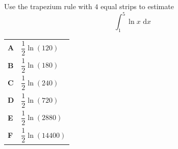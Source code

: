 \documentclass[11pt,a4paper]{article}
\begin{document}
\clearpage
\thispagestyle{djspaper}
\vspace*{8pt}
\begin{enumerate}[label=\textbf{\arabic*.},leftmargin=*,itemsep=0pt,start=4]
\questionitem[Integration]
Use the trapezium rule with $4$ equal strips to estimate \[ \int_{1}^{5} \ln x\,\,\mathrm{d}x \]

\par\vspace*{12pt}
\begin{tabularx}{\linewidth}{@{}>{\bfseries}l Y@{}}
A &
$\dfrac{1}{2}\ln(120)$
\\[0.8em]
B &
$\dfrac{1}{2}\ln(180)$
\\[0.8em]
C &
$\dfrac{1}{2}\ln(240)$
\\[0.8em]
D &
$\dfrac{1}{2}\ln(720)$
\\[0.8em]
E &
$\dfrac{1}{2}\ln(2880)$
\\[0.8em]
F &
$\dfrac{1}{2}\ln(14400)$
\\
\end{tabularx}
\end{enumerate}
\clearpage
\thispagestyle{djspaper}
\vspace*{8pt}
\end{document}
